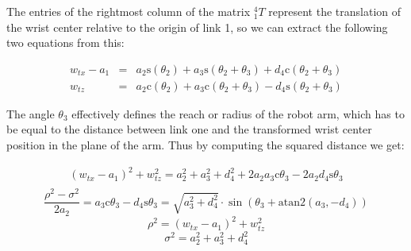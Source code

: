 \documentclass[twoside]{article}
\renewcommand{\c}{\text{c}}
\newcommand{\s}{\text{s}}
\newcommand{\T}[2]{\mbox{$_{#2}^{#1}{T}$}}
\begin{document}
The entries of the rightmost column of the matrix $\T{4}{1}$ represent the translation of the
wrist center relative to the origin of link 1, so we can extract the following two equations from this:

\begin{eqnarray}
   w_{tx} - a_1 &=& a_2\s(\theta_2) + a_3\s(\theta_2 + \theta_3) + d_4\c(\theta_2 + \theta_3) \\
   w_{tz}       &=& a_2\c(\theta_2) + a_3\c(\theta_2 + \theta_3) - d_4\s(\theta_2 + \theta_3)
\end{eqnarray}

The angle $\theta_3$ effectively defines the reach or radius of the robot arm, which has to be equal
to the distance between link one and the transformed wrist center position in the plane of the arm.
Thus by computing the squared distance we get:

\begin{equation}
\begin{split}
(w_{tx} - a_1)^2 + w_{tz}^2
  = a_2^2 + a_3^2 + d_4^2 + 2 a_2 a_3 \c\theta_3 - 2 a_2 d_4\s\theta_3 \\
\end{split}
\end{equation}
\begin{equation}
  \frac{\rho^2 - \sigma^2}{2 a_2} = a_3\c\theta_3 - d_4\s\theta_3 = \sqrt{a_3^2 + d_4^2} \cdot \sin(\theta_3 + \text{atan2}(a_3, -d_4))
  \label{eq:theta3}
\end{equation}
\begin{equation}
  \rho^2 = (w_{tx} - a_1)^2 + w_{tz}^2
\end{equation}
\begin{equation}
  \sigma^2 = a_2^2 + a_3^2 + d_4^2
\end{equation}

\end{document}
